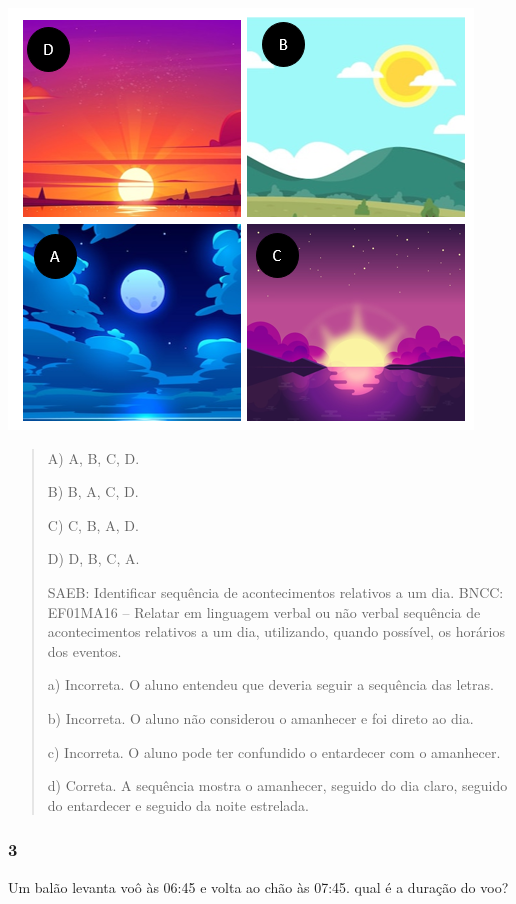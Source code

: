 \includegraphics[width=4.85484in,height=4.39645in]{media/image46.png}

\begin{quote}
A) A, B, C, D.

B) B, A, C, D.

C) C, B, A, D.

D) D, B, C, A.

SAEB: Identificar sequência de acontecimentos relativos a um dia.
BNCC: EF01MA16 -- Relatar em linguagem verbal ou não verbal sequência de
acontecimentos relativos a um dia, utilizando, quando possível, os
horários dos eventos.

a) Incorreta. O aluno entendeu que deveria seguir a sequência das letras.

b) Incorreta. O aluno não considerou o amanhecer e foi direto ao dia.

c) Incorreta. O aluno pode ter confundido o entardecer com o amanhecer.

d) Correta. A sequência mostra o amanhecer, seguido do dia claro, seguido
do entardecer e seguido da noite estrelada.
\end{quote}

\subsubsection{3}\label{section-53}

Um balão levanta voô às 06:45 e volta ao chão às 07:45. qual é a duração
do voo?

